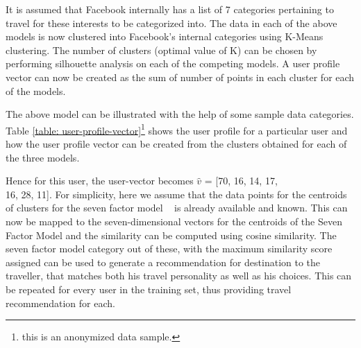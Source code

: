 It is assumed that Facebook internally has a list of 7 categories pertaining to travel for these interests to be categorized into. The data in each of the above models is now clustered into Facebook's internal categories using K-Means clustering. The number of clusters (optimal value of K) can be chosen by performing silhouette analysis on each of the competing models. A user profile vector can now be created as the sum of number of points in each cluster for each of the models. 


The above model can be illustrated with the help of some sample data categories. Table \ref{table: user-profile-vector}\footnote{this is an anonymized data sample.} shows the user profile for a particular user and how the user profile vector can be created from the clusters obtained for each of the three models.

\begin{table*}[t]
   
    \centering
     \caption{Generating the User-Profile Vector from User data clusters}
    \label{table: user-profile-vector}
\end{table*}

Hence for this user, the user-vector becomes 
$\hat{v}$ = [70, 16, 14, 17,\\16, 28, 11]. For simplicity, here we assume that the data points for the centroids of clusters for the seven factor model ~\cite{sertkan2018mapping} is already available and known. This can now be mapped to the seven-dimensional vectors for the centroids of the Seven Factor Model and the similarity can be computed using cosine similarity. The seven factor model category out of these, with the maximum similarity score assigned can be used to generate a recommendation for destination to the traveller, that matches both his travel personality as well as his choices.
This can be repeated for every user in the training set, thus providing travel recommendation for each.


